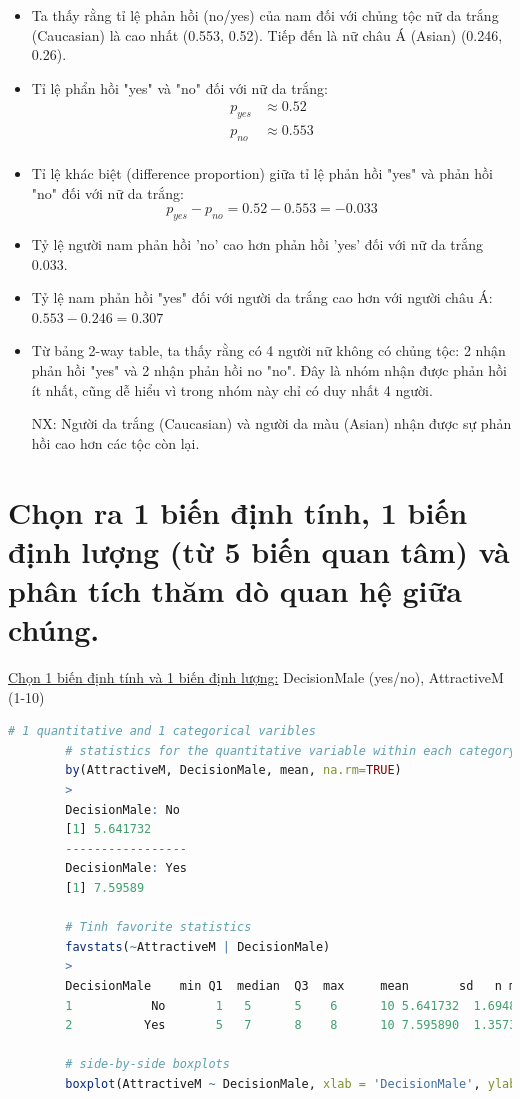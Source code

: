 \documentclass[a4paper,12pt]{article}
\begin{document}
	
	\begin{itemize}
		\item Ta thấy rằng tỉ lệ phản hồi (no/yes) của nam đối với chủng tộc nữ da trắng (Caucasian) là cao nhất (0.553, 0.52). Tiếp đến là nữ châu Á (Asian) (0.246, 0.26).
		\item Tỉ lệ phẩn hồi "yes" và "no" đối với nữ da trắng:
		\begin{align*}
			p_{yes} &\approx 0.52 \\
			p_{no} &\approx 0.553 \\
		\end{align*}
		
		\item Tỉ lệ khác biệt (difference proportion) giữa tỉ lệ phản hồi "yes" và phản hồi "no" đối với nữ da trắng:
		$$p_{yes} - p_{no} = 0.52 -0.553 = -0.033$$
		\item[\textrightarrow] Tỷ lệ người nam phản hồi 'no' cao hơn phản hồi 'yes' đối với nữ da trắng 0.033.
		
		\item Tỷ lệ nam phản hồi "yes" đối với người da trắng cao hơn với người châu Á: $0.553 - 0.246 = 0.307$
		
		\item Từ bảng 2-way table, ta thấy rằng có 4 người nữ không có chủng tộc: 2 nhận phản hồi "yes" và 2 nhận phản hồi no "no". Đây là nhóm nhận được phản hồi ít nhất, cũng dễ hiểu vì trong nhóm này chỉ có duy nhất 4 người.
		
		NX: Người da trắng (Caucasian) và người da màu (Asian) nhận được sự phản hồi cao hơn các tộc còn lại.
	\end{itemize}
	
	\section{Chọn ra 1 biến định tính, 1 biến định lượng (từ 5 biến quan tâm) và phân tích thăm dò quan hệ giữa chúng.}
	\underline{Chọn 1 biến định tính và 1 biến định lượng:} DecisionMale (yes/no), AttractiveM (1-10)\\
	
	
	\begin{lstlisting}[language = R]
		# 1 quantitative and 1 categorical varibles
		# statistics for the quantitative variable within each category
		by(AttractiveM, DecisionMale, mean, na.rm=TRUE)
		>
		DecisionMale: No
		[1] 5.641732
		----------------- 
		DecisionMale: Yes
		[1] 7.59589
		
		# Tinh favorite statistics
		favstats(~AttractiveM | DecisionMale)
		>   
		DecisionMale	min	Q1	median	Q3	max     mean       sd   n missing
		1           No  	 1 	 5      5 	 6  	10 5.641732	 1.694877 127       3
		2          Yes  	 5 	 7      8 	 8  	10 7.595890	 1.357375 146       0
		
		# side-by-side boxplots
		boxplot(AttractiveM ~ DecisionMale, xlab = 'DecisionMale', ylab = 'AttractiveM')
	\end{lstlisting}
	
\end{document}
